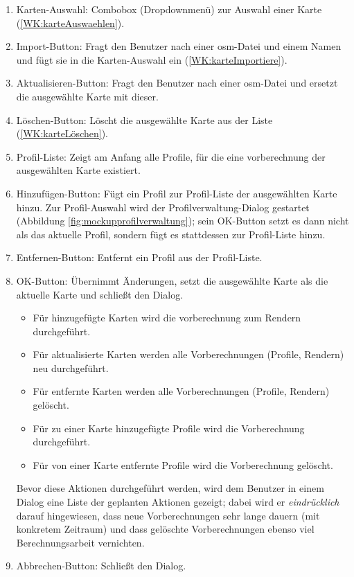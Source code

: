 \documentclass[a4paper, 11pt]{article}
\begin{document}
\begin{enumerate}
\item Karten-Auswahl: Combobox (Dropdownmenü) zur Auswahl einer Karte (\ref{WK:karteAuswaehlen}).
\item Import-Button: Fragt den Benutzer nach einer \gls{osm}-Datei und einem Namen und fügt sie in die Karten-Auswahl ein (\ref{WK:karteImportiere}).
\item Aktualisieren-Button: Fragt den Benutzer nach einer \gls{osm}-Datei und ersetzt die ausgewählte Karte mit dieser.
\item Löschen-Button: Löscht die ausgewählte Karte aus der Liste (\ref{WK:karteLöschen}).
\item Profil-Liste: Zeigt am Anfang alle Profile, für die eine \gls{vorberechnung} der ausgewählten Karte existiert.
\item Hinzufügen-Button: Fügt ein Profil zur Profil-Liste der ausgewählten Karte hinzu. Zur Profil-Auswahl wird der Profilverwaltung-Dialog gestartet (Abbildung \ref{fig:mockupprofilverwaltung}); sein OK-Button setzt es dann nicht als das aktuelle Profil, sondern fügt es stattdessen zur Profil-Liste hinzu.
\item Entfernen-Button: Entfernt ein Profil aus der Profil-Liste.
\item OK-Button: Übernimmt Änderungen, setzt die ausgewählte Karte als die aktuelle Karte und schließt den Dialog.
  \begin{itemize}
  \item Für hinzugefügte Karten wird die \gls{vorberechnung} zum Rendern durchgeführt.
  \item Für aktualisierte Karten werden alle Vorberechnungen (Profile, Rendern) neu durchgeführt.
  \item Für entfernte Karten werden alle Vorberechnungen (Profile, Rendern) gelöscht.
  \item Für zu einer Karte hinzugefügte Profile wird die Vorberechnung durchgeführt.
  \item Für von einer Karte entfernte Profile wird die Vorberechnung gelöscht.
  \end{itemize}
  Bevor diese Aktionen durchgeführt werden, wird dem Benutzer in einem Dialog eine Liste der geplanten Aktionen gezeigt; dabei wird er \emph{eindrücklich} darauf hingewiesen, dass neue Vorberechnungen sehr lange dauern (mit konkretem Zeitraum) und dass gelöschte Vorberechnungen ebenso viel Berechnungsarbeit vernichten.
\item Abbrechen-Button: Schließt den Dialog.
\end{enumerate}
\end{document}
